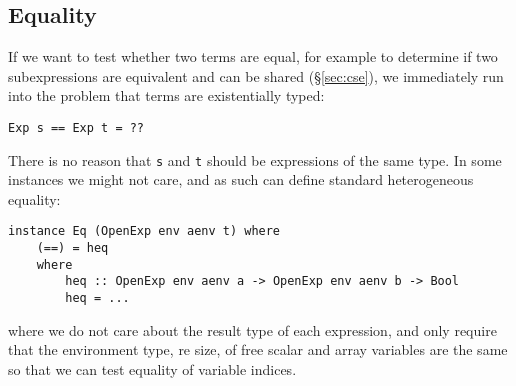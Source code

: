 
\subsection{Equality}

If we want to test whether two terms are equal, for example to determine if two
subexpressions are equivalent and can be shared (\S\ref{sec:cse}), we
immediately run into the problem that terms are existentially typed:
%
\begin{lstlisting}[style=haskell]
Exp s == Exp t = ??
\end{lstlisting}
%
There is no reason that \texttt{s} and \texttt{t} should be expressions of the
same type. In some instances we might not care, and as such can define standard
heterogeneous equality:
%
\begin{lstlisting}[style=haskell]
instance Eq (OpenExp env aenv t) where
    (==) = heq
    where
        heq :: OpenExp env aenv a -> OpenExp env aenv b -> Bool
        heq = ...
\end{lstlisting}
%
where we do not care about the result type of each expression, and only require
that the environment type, re size, of free scalar and array variables are the
same so that we can test equality of variable indices.

